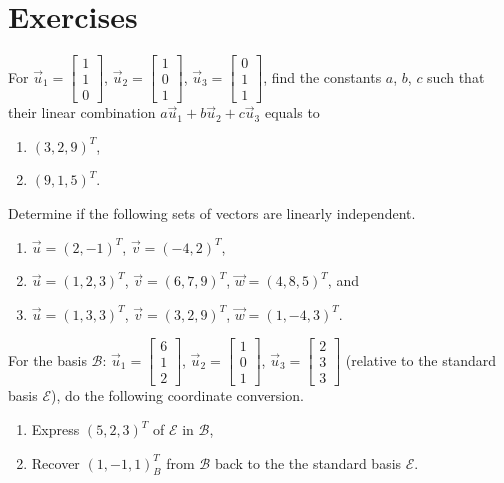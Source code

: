 \section{Exercises}

\begin{Exercise}
For $\vec{u}_1 =
\begin{bmatrix}
1\\
1\\
0
\end{bmatrix}$,
$\vec{u}_2 =
\begin{bmatrix}
1\\
0\\
1
\end{bmatrix}$,
$\vec{u}_3 =
\begin{bmatrix}
0\\
1\\
1
\end{bmatrix}$,
find the constants $a$, $b$, $c$ such that their linear combination $a\vec{u}_1 + b\vec{u}_2 + c\vec{u}_3$ equals to 
\begin{enumerate}[label=(\alph*)]
\item $(3,2,9)^T$, 
\item $(9,1,5)^T$.
\end{enumerate}
\end{Exercise}

\begin{Exercise}
Determine if the following sets of vectors are linearly independent.
\begin{enumerate}[label=(\alph*)]
\item $\vec{u} = (2,-1)^T$, $\vec{v} = (-4,2)^T$,
\item $\vec{u} = (1,2,3)^T$, $\vec{v} = (6,7,9)^T$, $\vec{w} = (4,8,5)^T$, and
\item $\vec{u} = (1,3,3)^T$, $\vec{v}=(3,2,9)^T$, $\vec{w} = (1,-4,3)^T$.
\end{enumerate}
\end{Exercise}

\begin{Exercise}
For the basis $\mathcal{B}$: $\vec{u}_1 = 
\begin{bmatrix}
6\\
1\\
2
\end{bmatrix}$,
$\vec{u}_2 = 
\begin{bmatrix}
1\\
0\\
1
\end{bmatrix}$,
$\vec{u}_3 = 
\begin{bmatrix}
2\\
3\\
3
\end{bmatrix}$
(relative to the standard basis $\mathcal{E}$), do the following coordinate conversion.
\begin{enumerate}[label=(\alph*)]
\item Express $(5, 2, 3)^T$ of $\mathcal{E}$ in $\mathcal{B}$,
\item Recover $(1, -1, 1)^T_B$ from $\mathcal{B}$ back to the the standard basis $\mathcal{E}$.
\end{enumerate}
\end{Exercise}

